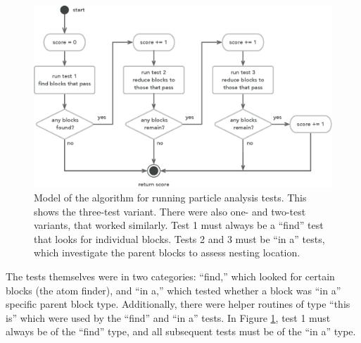\begin{figure}
  \centering
      \includegraphics[width=\textwidth]{diagrams/particle-run3}
  \caption[Particle analysis test running algorithm]{Model of the algorithm for running particle analysis tests. This shows the three-test variant. There were also one- and two-test variants, that worked similarly. Test 1 must always be a ``find'' test that looks for individual blocks. Tests 2 and 3 must be ``in a'' tests, which investigate the parent blocks to assess nesting location. 
  }
  \label{fig:particle-run3}
\end{figure}

The tests themselves were in two categories: ``find,'' which looked for certain blocks (the atom finder), and ``in a,'' which tested whether a block was ``in a'' specific parent block type. Additionally, there were helper routines of type ``this is'' which were used by the ``find'' and ``in a'' tests. In Figure \ref{fig:particle-run3}, test 1 must always be of the ``find'' type, and all subsequent tests must be of the ``in a'' type. 


